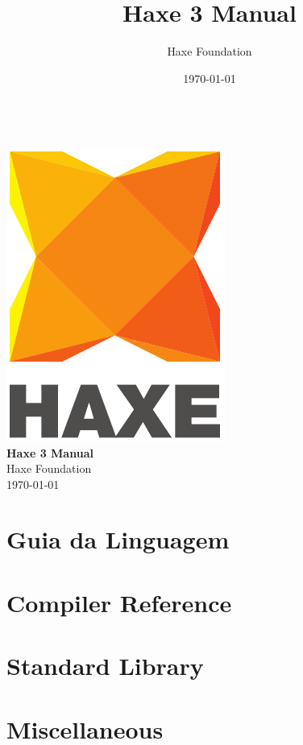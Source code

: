 \documentclass{haxe}
\renewcommand{\maketitle}{
   \begin{titlepage}
     \setcounter{page}{-1}
			\begin{center}
				~\\[3cm]
				\includegraphics[scale=1.25]{assets/logo.pdf}~\\[1cm]
				{\huge \bfseries Haxe 3 Manual}\\[7cm]
				Haxe Foundation\\
				\today
			\end{center}
   \end{titlepage}
}
\begin{document}
\title{Haxe 3 Manual}
\author{Haxe Foundation}
\date{\today}
\maketitle


\clearpage
\todototoc
\listoftodos
\clearpage

\clearpage
\tableofcontents
\clearpage



\part{Guia da Linguagem}

% 
% 
% 
% 

\part{Compiler Reference}
% 
% 
% 

\part{Standard Library}
% 

\part{Miscellaneous}
% 
% 
\end{document}
